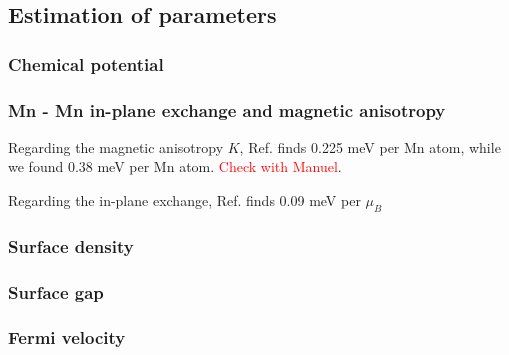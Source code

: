 \documentclass[showpacs, preprintnumbers, pra, superscriptaddress, floatfix, onecolumn, longbibliography]{revtex4-1}
\begin{document}
\subsection{Estimation of parameters}

\subsubsection{Chemical potential}

\subsubsection{Mn - Mn in-plane exchange and magnetic anisotropy}
Regarding the magnetic anisotropy $K$, Ref. \cite{otrokov2019prediction} finds 0.225 meV per Mn atom, while we found 0.38 meV per Mn atom. \textcolor{red}{Check with Manuel}.

Regarding the in-plane exchange, Ref. \cite{otrokov2019prediction} finds 0.09 meV per $\mu_B$

\subsubsection{Surface density}

\subsubsection{Surface gap}

\subsubsection{Fermi velocity}





\end{document}

